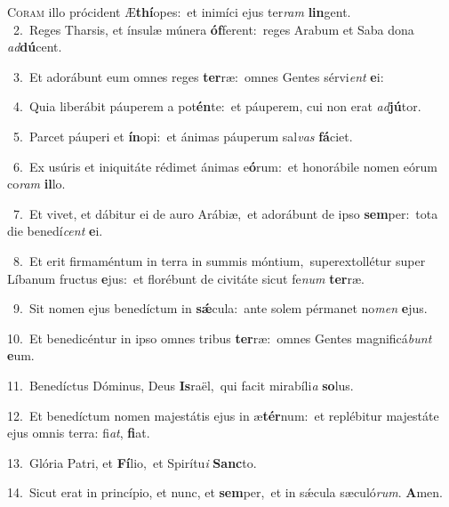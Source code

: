 \lettrine{\initial\textcolor{\initialcolor}{C}}{oram} illo prócident Æ\-\textbf{thí}\-opes:~\star et inimíci ejus ter\textit{ram} \textbf{lin}\-gent.\\
{\numbfont\textcolor{\numbcolor}{~2.}}~Reges Tharsis, et ínsulæ múnera \textbf{óf}\-ferent:~\star reges Arabum et Saba dona \textit{ad}\-\textbf{dú}cent.\par
{\numbfont\textcolor{\numbcolor}{~3.}}~Et adorábunt eum omnes reges \textbf{ter}\-ræ:~\star omnes Gentes sérvi\textit{ent} \textbf{e}\-i:\par
{\numbfont\textcolor{\numbcolor}{~4.}}~Quia liberábit páuperem a pot\-\textbf{én}\-te:~\star et páuperem, cui non erat \textit{ad}\-\textbf{jú}tor.\par
{\numbfont\textcolor{\numbcolor}{~5.}}~Parcet páuperi et \textbf{ín}\-opi:~\star et ánimas páuperum sal\textit{vas} \textbf{fá}\-ciet.\par
{\numbfont\textcolor{\numbcolor}{~6.}}~Ex usúris et iniquitáte rédimet ánimas e\-\textbf{ó}\-rum:~\star et honorábile nomen eórum co\textit{ram} \textbf{il}\-lo.\par
{\numbfont\textcolor{\numbcolor}{~7.}}~Et vivet, et dábitur ei de auro Arábiæ,~\dagger et adorábunt de ipso \textbf{sem}\-per:~\star tota die benedí\textit{cent} \textbf{e}\-i.\par
{\numbfont\textcolor{\numbcolor}{~8.}}~Et erit firmaméntum in terra in summis móntium,~\dagger superextollétur super Líbanum fructus \textbf{e}\-jus:~\star et florébunt de civitáte sicut fe\textit{num} \textbf{ter}\-ræ.\par
{\numbfont\textcolor{\numbcolor}{~9.}}~Sit nomen ejus benedíctum in \textbf{sǽ}\-cula:~\star ante solem pérmanet no\textit{men} \textbf{e}\-jus.\par
{\numbfont\textcolor{\numbcolor}{10.}}~Et benedicéntur in ipso omnes tribus \textbf{ter}\-ræ:~\star omnes Gentes magnificá\textit{bunt} \textbf{e}\-um.\par
{\numbfont\textcolor{\numbcolor}{11.}}~Benedíctus Dóminus, Deus \textbf{Is}\-raël,~\star qui facit mirabíli\textit{a} \textbf{so}\-lus.\par
{\numbfont\textcolor{\numbcolor}{12.}}~Et benedíctum nomen majestátis ejus in æ\-\textbf{tér}\-num:~\star et replébitur majestáte ejus omnis terra: fi\-\textit{at}\-, \textbf{fi}\-at.\par
{\numbfont\textcolor{\numbcolor}{13.}}~Glória Patri, et \textbf{Fí}\-lio,~\star et Spirítu\textit{i} \textbf{Sanc}\-to.\par
{\numbfont\textcolor{\numbcolor}{14.}}~Sicut erat in princípio, et nunc, et \textbf{sem}\-per,~\star et in sǽcula sæculó\-\textit{rum}\-. \textbf{A}\-men.\par
